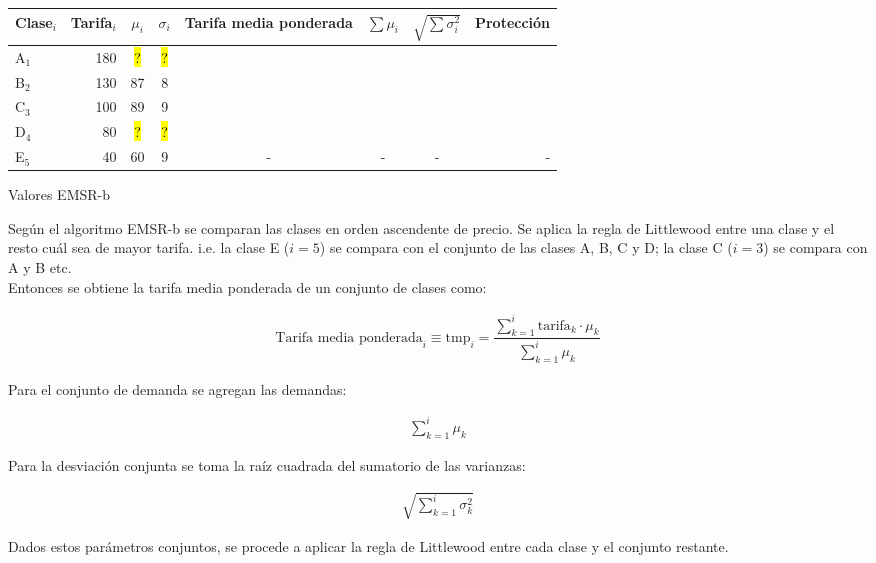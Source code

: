 \documentclass[12pt]{article}
\begin{document}
\begin{adjustwidth}{-2.5 cm}{-2.5 cm}\centering
\begin{threeparttable}[!htb]

\begin{tabular}{lrcccccr}\toprule
Clase$_i$ & Tarifa$_i$ & $\mu_i$ &$\sigma_i$ & Tarifa media ponderada & $\sum \mu_i$ & $\sqrt{\sum \sigma_i^2}$ & Protección\\\midrule
A$_1$ & 180 & \hl{ ? } &\hl{ ? } & & & & \\
B$_2$ & 130 & 87 &8 & & & & \\
C$_3$ & 100 & 89 &9 & & & & \\
D$_4$ & 80 & \hl{ ? } &\hl{ ? } & & & & \\
E$_5$ & 40 & 60 &9 & - & - & - & -\\
\bottomrule
\end{tabular}

\caption{Valores EMSR-b}\label{tab:emsr}
\end{threeparttable}

\end{adjustwidth}


Según el algoritmo EMSR-b se comparan las clases en orden ascendente de precio. Se aplica la regla de Littlewood entre una clase y el resto cuál sea de mayor tarifa.
i.e. la clase E ($i = 5$) se compara con el conjunto de las clases A, B, C y D; la clase C ($i = 3$) se compara con A y B etc.\\


Entonces se obtiene la tarifa media ponderada de un conjunto de clases como:

\begin{align}
\text{Tarifa media ponderada}_i \equiv \text{tmp}_i = \dfrac{\sum_{k=1}^{i} \text{tarifa}_k \cdot \mu_k}{\sum_{k=1}^{i} \mu_k}
\end{align}

Para el conjunto de demanda se agregan las demandas:

\begin{align}
\sum_{k=1}^{i} \mu_k
\end{align}

Para la desviación conjunta se toma la raíz cuadrada del sumatorio de las varianzas:

\begin{align}
\sqrt{\sum_{k=1}^i \sigma_k^2}
\end{align}


Dados estos parámetros conjuntos, se procede a aplicar la regla de Littlewood entre cada clase y el conjunto restante.
\end{document}
